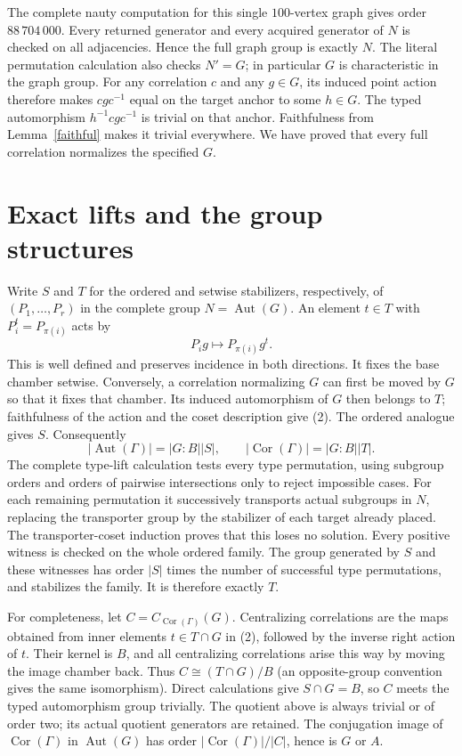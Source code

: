 \documentclass[11pt]{article}
\newcommand{\Aut}{\operatorname{Aut}}
\newcommand{\Cor}{\operatorname{Cor}}
\begin{document}
The complete nauty computation for this single $100$-vertex graph gives
order $88\,704\,000$. Every returned generator and every acquired
generator of $N$ is checked on all adjacencies. Hence the full graph
group is exactly $N$. The literal permutation calculation also checks
$N'=G$; in particular $G$ is characteristic in the graph group.
For any correlation $c$ and any $g\in G$, its induced point action
therefore makes $cgc^{-1}$ equal on the target anchor to some $h\in G$.
The typed automorphism $h^{-1}cgc^{-1}$ is trivial on that anchor.
Faithfulness from Lemma~\ref{faithful} makes it trivial everywhere.
We have proved that every full correlation normalizes the specified $G$.

\section*{Exact lifts and the group structures}
Write $S$ and $T$ for the ordered and setwise stabilizers, respectively,
of $(P_1,\ldots,P_r)$ in the complete group $N=\Aut(G)$.
An element $t\in T$ with $P_i^t=P_{\pi(i)}$ acts by
\[
             P_i g\longmapsto P_{\pi(i)}g^t .                \tag{2}
\]
This is well defined and preserves incidence in both directions.
It fixes the base chamber setwise. Conversely, a correlation normalizing
$G$ can first be moved by $G$ so that it fixes that chamber. Its induced
automorphism of $G$ then belongs to $T$; faithfulness of the action and
the coset description give (2). The ordered analogue gives $S$.
Consequently
\[
 |\Aut(\Gamma)|=|G:B||S|,\qquad
 |\Cor(\Gamma)|=|G:B||T|.                                  \tag{3}
\]
The complete type-lift calculation tests every type permutation, using
subgroup orders and orders of pairwise intersections only to reject impossible cases.
For each remaining permutation it successively transports actual
subgroups in $N$, replacing the transporter group by the stabilizer
of each target already placed. The transporter-coset induction proves
that this loses no solution. Every positive witness is checked on the
whole ordered family. The group generated by $S$ and these witnesses
has order $|S|$ times the number of successful type permutations, and
stabilizes the family. It is therefore exactly $T$.

For completeness, let $C=C_{\Cor(\Gamma)}(G)$. Centralizing correlations
are the maps obtained from inner elements $t\in T\cap G$ in (2),
followed by the inverse right action of $t$. Their kernel is $B$, and
all centralizing correlations arise this way by moving the image chamber
back. Thus $C\cong (T\cap G)/B$ (an opposite-group convention gives the
same isomorphism). Direct calculations give $S\cap G=B$, so $C$ meets
the typed automorphism group trivially. The quotient above is always
trivial or of order two; its actual quotient generators are retained.
The conjugation image of $\Cor(\Gamma)$ in $\Aut(G)$ has order
$|\Cor(\Gamma)|/|C|$, hence is $G$ or $A$.
\end{document}
